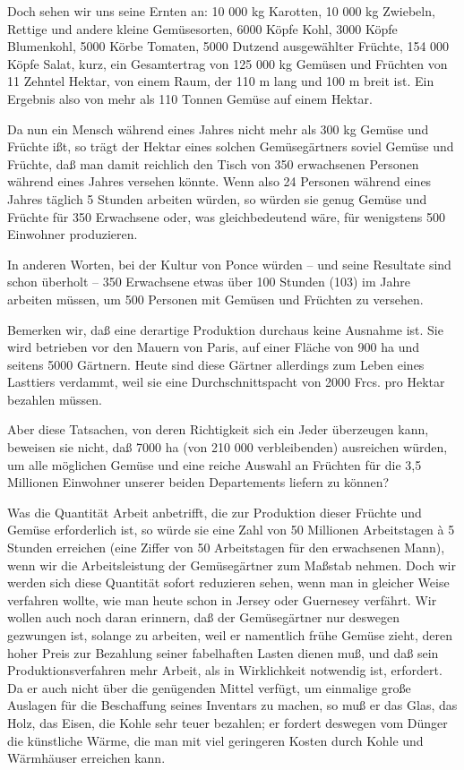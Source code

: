 \documentclass{scrbook}
\begin{document}
Doch sehen wir uns seine Ernten an: 10 000 kg Karotten, 10 000 kg Zwiebeln, Rettige und andere kleine Gemüsesorten, 6000 Köpfe Kohl, 3000 Köpfe Blumenkohl, 5000 Körbe Tomaten, 5000 Dutzend ausgewählter Früchte, 154 000 Köpfe Salat, kurz, ein Gesamtertrag von 125 000 kg Gemüsen und Früchten von 11 Zehntel Hektar, von einem Raum, der 110 m lang und 100 m breit ist. Ein Ergebnis also von mehr als 110 Tonnen Gemüse auf einem Hektar.

Da nun ein Mensch während eines Jahres nicht mehr als 300 kg Gemüse und Früchte ißt, so trägt der Hektar eines solchen Gemüsegärtners soviel Gemüse und Früchte, daß man damit reichlich den Tisch von 350 erwachsenen Personen während eines Jahres versehen könnte. Wenn also 24 Personen während eines Jahres täglich 5 Stunden arbeiten würden, so würden sie genug Gemüse und Früchte für 350 Erwachsene oder, was gleichbedeutend wäre, für wenigstens 500 Einwohner produzieren.

In anderen Worten, bei der Kultur von Ponce würden – und seine Resultate sind schon überholt – 350 Erwachsene etwas über 100 Stunden (103) im Jahre arbeiten müssen, um 500 Personen mit Gemüsen und Früchten zu versehen.

Bemerken wir, daß eine derartige Produktion durchaus keine Ausnahme ist. Sie wird betrieben vor den Mauern von Paris, auf einer Fläche von 900 ha und seitens 5000 Gärtnern. Heute sind diese Gärtner allerdings zum Leben eines Lasttiers verdammt, weil sie eine Durchschnittspacht von 2000 Frcs. pro Hektar bezahlen müssen.

Aber diese Tatsachen, von deren Richtigkeit sich ein Jeder überzeugen kann, beweisen sie nicht, daß 7000 ha (von 210 000 verbleibenden) ausreichen würden, um alle möglichen Gemüse und eine reiche Auswahl an Früchten für die 3,5 Millionen Einwohner unserer beiden Departements liefern zu können?

Was die Quantität Arbeit anbetrifft, die zur Produktion dieser Früchte und Gemüse erforderlich ist, so würde sie eine Zahl von 50 Millionen Arbeitstagen à 5 Stunden erreichen (eine Ziffer von 50 Arbeitstagen für den erwachsenen Mann), wenn wir die Arbeitsleistung der Gemüsegärtner zum Maßstab nehmen. Doch wir werden sich diese Quantität sofort reduzieren sehen, wenn man in gleicher Weise verfahren wollte, wie man heute schon in Jersey oder Guernesey verfährt. Wir wollen auch noch daran erinnern, daß der Gemüsegärtner nur deswegen gezwungen ist, solange zu arbeiten, weil er namentlich frühe Gemüse zieht, deren hoher Preis zur Bezahlung seiner fabelhaften Lasten dienen muß, und daß sein Produktionsverfahren mehr Arbeit, als in Wirklichkeit notwendig ist, erfordert. Da er auch nicht über die genügenden Mittel verfügt, um einmalige große Auslagen für die Beschaffung seines Inventars zu machen, so muß er das Glas, das Holz, das Eisen, die Kohle sehr teuer bezahlen; er fordert deswegen vom Dünger die künstliche Wärme, die man mit viel geringeren Kosten durch Kohle und Wärmhäuser erreichen kann.
\end{document}
